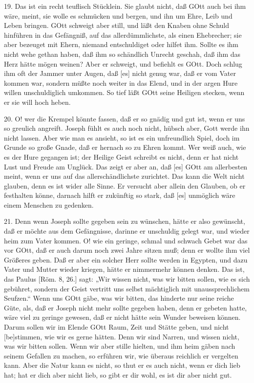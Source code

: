 19. Das ist ein recht teuflisch Stücklein. Sie glaubt nicht, daß GOtt auch bei ihm wäre, meint, sie wolle es schmücken und bergen, und ihn um Ehre, Leib und Leben bringen. GOtt schweigt aber still, und läßt den Knaben ohne Schuld hinführen in das Gefängniß, auf das allerdümmlichste, als einen Ehebrecher; sie aber bezeuget mit Ehern, niemand entschuldiget oder hilfet ihm. Sollte es ihm nicht wehe gethan haben, daß ihm so schändlich Unrecht geschah, daß ihm das Herz hätte mögen weinen? Aber er schweigt, und befiehlt es GOtt. Doch schlug ihm oft der Jammer unter Augen, daß [es] nicht genug war, daß er vom Vater kommen war, sondern müßte noch weiter in das Elend, und in der argen Hure willen unschuldiglich umkommen. So tief läßt GOtt seine Heiligen stecken, wenn er sie will hoch heben.

20. O! wer die Krempel könnte fassen, daß er so gnädig und gut ist, wenn er uns so greulich angreift. Joseph fühlt es auch noch nicht, hübsch aber, Gott werde ihn nicht lassen. Aber wie man es ansieht, so ist es ein unfreundlich Spiel, doch im Grunde so große Gnade, daß er hernach so zu Ehren kommt. Wer weiß auch, wie es der Hure gegangen ist; der Heilige Geist schreibt es nicht, denn er hat nicht Lust und Freude am Unglück. Das zeigt er aber an, daß [es] GOtt am allerbesten meint, wenn er uns auf das allerschändlichste zurichtet. Das kann die Welt nicht glauben, denn es ist wider alle
Sinne. Er versucht aber allein den Glauben, ob er festhalten könne, darnach hilft er zukünftig so stark, daß [es] unmöglich wäre einem Menschen zu gedenken.

21. Denn wenn Joseph sollte gegeben sein zu wünschen, hätte er also gewünscht, daß er möchte aus dem Gefängnisse, darinne er unschuldig gelegt war, und wieder heim zum Vater kommen. O! wie ein geringe, schmal und schwach Gebet war das vor GOtt, daß er auch darum noch zwei Jahre sitzen muß; denn er wollte ihm viel Größeres geben. Daß er aber ein solcher Herr sollte werden in Egypten, und dazu Vater und Mutter wieder kriegen, hätte er nimmermehr können denken. Das ist, das Paulus [Röm. 8, 26.] sagt: „Wir wissen nicht, was wir bitten sollen, wie es sich gebühret, sondern der Geist vertritt uns selbst mächtiglich mit unaussprechlichem Seufzen.“ Wenn uns GOtt gäbe, was wir bitten, das hinderte nur seine reiche Güte, als, daß er Joseph nicht mehr sollte gegeben haben, denn er gebeten hatte, wäre viel zu geringe gewesen, daß er nicht hätte sein Wunder beweisen können. Darum sollen wir im Elende GOtt Raum, Zeit und Stätte geben, und nicht [be]stimmen, wie wir es gerne hätten. Denn wir sind Narren, und wissen nicht, was wir bitten sollen. Wenn wir aber stille hielten, und ihm heim gäben nach seinem Gefallen zu machen, so erführen wir, wie überaus reichlich er vergelten kann. Aber die Natur kann es nicht, so thut er es auch nicht, wenn er dich lieb hat; hat er dich aber nicht lieb, so gibt er dir wohl, es ist dir aber nicht gut.

